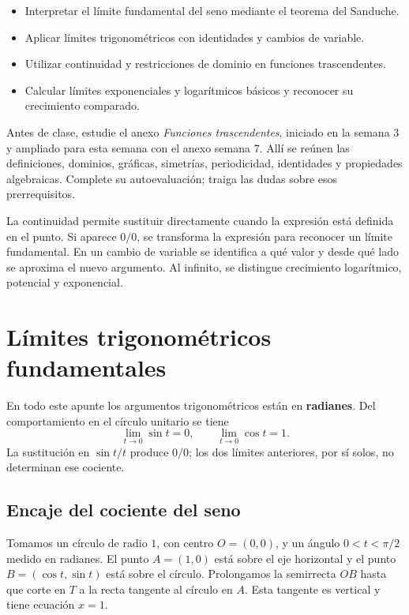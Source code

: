 \documentclass[10pt,a5paper]{article}
\begin{document}

\begin{objetivos}
\begin{itemize}
  \item Interpretar el límite fundamental del seno mediante el teorema del Sanduche.
  \item Aplicar límites trigonométricos con identidades y cambios de variable.
  \item Utilizar continuidad y restricciones de dominio en funciones trascendentes.
  \item Calcular límites exponenciales y logarítmicos básicos y reconocer su crecimiento comparado.
\end{itemize}
\end{objetivos}

\begin{nota}
Antes de clase, estudie el anexo \emph{Funciones trascendentes}, iniciado en la semana 3 y ampliado para esta semana con el anexo semana 7. Allí se reúnen las definiciones, dominios, gráficas, simetrías, periodicidad, identidades y propiedades algebraicas. Complete su autoevaluación; traiga las dudas sobre esos prerrequisitos.
\end{nota}

\begin{resumen}
La continuidad permite sustituir directamente cuando la expresión está definida en el punto. Si aparece $0/0$, se transforma la expresión para reconocer un límite fundamental. En un cambio de variable se identifica a qué valor y desde qué lado se aproxima el nuevo argumento. Al infinito, se distingue crecimiento logarítmico, potencial y exponencial.
\end{resumen}

\section*{Límites trigonométricos fundamentales}

En todo este apunte los argumentos trigonométricos están en \textbf{radianes}. Del comportamiento en el círculo unitario se tiene
\[
  \lim_{t\to0}\sin t=0,\qquad \lim_{t\to0}\cos t=1.
\]
La sustitución en $\sin t/t$ produce $0/0$; los dos límites anteriores, por sí solos, no determinan ese cociente.

\subsection*{Encaje del cociente del seno}
Tomamos un círculo de radio $1$, con centro $O=(0,0)$, y un ángulo $0<t<\pi/2$ medido en radianes. El punto $A=(1,0)$ está sobre el eje horizontal y el punto $B=(\cos t,\sin t)$ está sobre el círculo. Prolongamos la semirrecta $OB$ hasta que corte en $T$ a la recta tangente al círculo en $A$. Esta tangente es vertical y tiene ecuación $x=1$.
\end{document}

